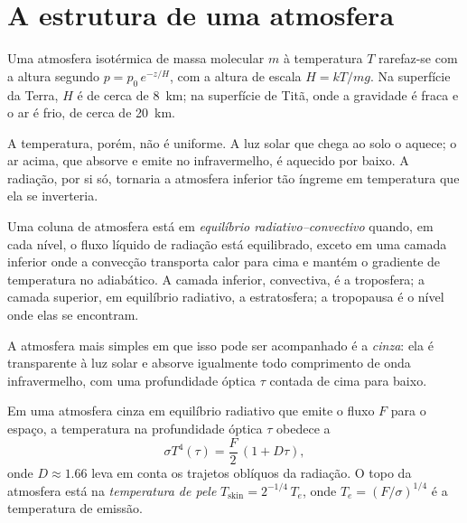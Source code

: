 \section{A estrutura de uma atmosfera}\label{sec:b3:planetary-atmospheres:structure}

Uma atmosfera isotérmica de massa molecular $m$ à temperatura $T$ rarefaz-se
com a altura segundo $p = p_0\,e^{-z/H}$, com a altura de escala $H = kT/mg$. Na
superfície da Terra, $H$ é de cerca de \qty{8}{km}; na superfície de
Titã, onde a gravidade é fraca e o ar é frio, de cerca de \qty{20}{km}.

A temperatura, porém, não é uniforme. A luz solar que chega ao solo o aquece;
o ar acima, que absorve e emite no infravermelho, é aquecido por baixo.
A radiação, por si só, tornaria a atmosfera inferior tão íngreme em temperatura
que ela se inverteria.

\begin{definition}\label{def:b3:planetary-atmospheres:rce}
Uma coluna de atmosfera está em \emph{equilíbrio
radiativo--convectivo} quando, em cada nível,
o fluxo líquido de radiação está equilibrado, exceto em uma camada inferior onde
a convecção transporta calor para cima e mantém o gradiente de temperatura
no adiabático. A camada inferior, convectiva, é a troposfera; a camada superior,
em equilíbrio radiativo, a estratosfera; a tropopausa é o nível onde elas se
encontram.
\end{definition}

A atmosfera mais simples em que isso pode ser acompanhado é a \emph{cinza}: ela é
transparente à luz solar e absorve igualmente todo comprimento de onda infravermelho,
com uma profundidade óptica $\tau$ contada de cima para baixo.

\begin{proposition}\label{prop:b3:planetary-atmospheres:grey}
Em uma atmosfera cinza em equilíbrio radiativo que emite o fluxo $F$ para o
espaço, a temperatura na profundidade óptica $\tau$ obedece a
\[
\sigma T^4(\tau) = \frac F2\,(1 + D\tau),
\]
onde $D \approx 1.66$ leva em conta os trajetos oblíquos da radiação.
O topo da atmosfera está na \emph{temperatura de pele}
$T_\mathrm{skin} = 2^{-1/4}\,T_e$, onde $T_e = (F/\sigma)^{1/4}$ é a
temperatura de emissão.
\end{proposition}

